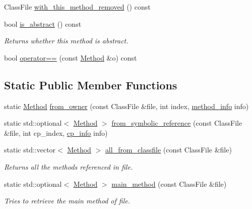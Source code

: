 \begin{DoxyCompactItemize}
Class\+File \hyperlink{classMethod_a52e769352ce657232db3a1b936e930b1}{with\+\_\+this\+\_\+method\+\_\+removed} () const
\item 
\mbox{\label{classMethod_a6dfb75c6faf8961c6e04a86eca6e97e8}} 
bool \hyperlink{classMethod_a6dfb75c6faf8961c6e04a86eca6e97e8}{is\+\_\+abstract} () const
\begin{DoxyCompactList}\small\item\em Returns whether this method is abstract. \end{DoxyCompactList}\item 
bool \hyperlink{classMethod_afa02f09f3037782d08463433465181b6}{operator==} (const \hyperlink{classMethod}{Method} \&o) const
\end{DoxyCompactItemize}
\subsection*{Static Public Member Functions}
\begin{DoxyCompactItemize}
\item 
static \hyperlink{classMethod}{Method} \hyperlink{classMethod_ad977afdb14569e1108c6b6849fe0b007}{from\+\_\+owner} (const Class\+File \&file, int index, \hyperlink{structmethod__info}{method\+\_\+info} info)
\item 
static std\+::optional$<$ \hyperlink{classMethod}{Method} $>$ \hyperlink{classMethod_adddc54ce699dfb1ba305595507085a29}{from\+\_\+symbolic\+\_\+reference} (const Class\+File \&file, int cp\+\_\+index, \hyperlink{structcp__info}{cp\+\_\+info} info)
\item 
\mbox{\label{classMethod_a7b631e75e7438bb79c285b1bc6a712ab}} 
static std\+::vector$<$ \hyperlink{classMethod}{Method} $>$ \hyperlink{classMethod_a7b631e75e7438bb79c285b1bc6a712ab}{all\+\_\+from\+\_\+classfile} (const Class\+File \&file)
\begin{DoxyCompactList}\small\item\em Returns all the methods referenced in {\ttfamily file}. \end{DoxyCompactList}\item 
\mbox{\label{classMethod_a74801df628f1be6e2c616cf5feb328b1}} 
static std\+::optional$<$ \hyperlink{classMethod}{Method} $>$ \hyperlink{classMethod_a74801df628f1be6e2c616cf5feb328b1}{main\+\_\+method} (const Class\+File \&file)
\begin{DoxyCompactList}\small\item\em Tries to retrieve the main method of {\ttfamily file}. \end{DoxyCompactList}\end{DoxyCompactItemize}


